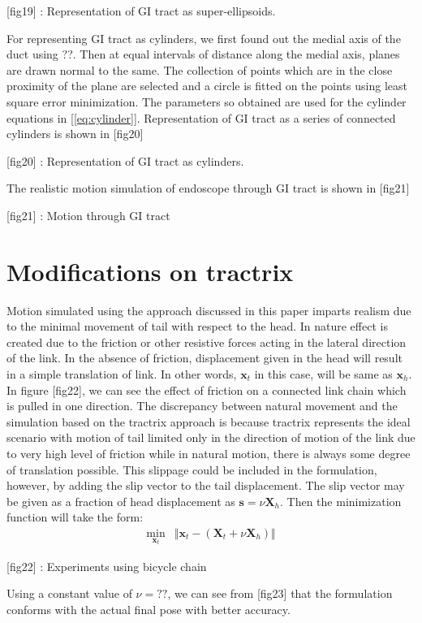 \documentclass[11pt,a4paper]{article}
\begin{document}
[fig19] : Representation of GI tract as super-ellipsoids.

For representing GI tract as cylinders, we first found out the medial axis of the duct using ??. Then at equal intervals of distance along the medial axis, planes are drawn normal to the same. The collection of points which are in the close proximity of the plane are selected and a circle is fitted on the points using least square error minimization. The parameters so obtained are used for the cylinder equations in [\ref{eq:cylinder}]. Representation of GI tract as a series of connected cylinders is shown in [fig20]

[fig20] : Representation of GI tract as cylinders.

The realistic motion simulation of endoscope through GI tract is shown in [fig21]

[fig21] : Motion through GI tract
\section{Modifications on tractrix}
Motion simulated using the approach discussed in this paper imparts realism due to the minimal movement of tail with respect to the head. In nature effect is created due to the friction or other resistive forces acting in the lateral direction of the link. In the absence of friction, displacement given in the head will result in a simple translation of link. In other words, $\mathbf{x}_t$ in this case, will be same as $\mathbf{x}_h$. In figure [fig22], we can see the effect of friction on a connected link chain which is pulled in one direction. The discrepancy between natural movement and the simulation based on the tractrix approach is because tractrix represents the ideal scenario with motion of tail limited only in the direction of motion of the link due to very high level of friction while in natural motion, there is always some degree of translation possible. This slippage could be included in the formulation, however, by adding the slip vector to the tail displacement. The slip vector may be given as a fraction of head displacement as $\mathbf{s} = \nu \mathbf{X}_h$. Then the minimization function will take the form:
\begin{align}
\min_{\textbf{x}_t} &\Vert \textbf{x}_t-\left(\mathbf{X}_t + \nu \mathbf{X}_h \right) \Vert
\end{align}

[fig22] : Experiments using bicycle chain

Using a constant value of $\nu = ??$, we can see from [fig23] that the formulation conforms with the actual final pose with better accuracy. 
\end{document}
